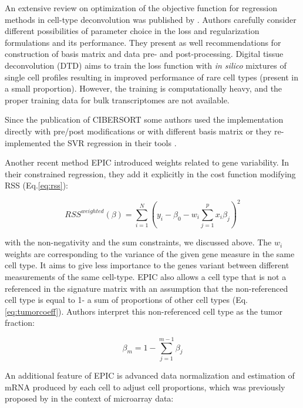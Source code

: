 \documentclass[12pt,]{book}
\theoremstyle{definition}
\theoremstyle{definition}
\theoremstyle{definition}
\theoremstyle{remark}
\begin{document}
An extensive review on optimization of the objective function for
regression methods in cell-type deconvolution was published by
\citet{Mohammadi2017}. Authors carefully consider different
possibilities of parameter choice in the loss and regularization
formulations and its performance. They present as well recommendations
for construction of basis matrix and data pre- and post-processing.
Digital tissue deconvolution (DTD) \citep{Gortler2018} aims to train the
loss function with \emph{in silico} mixtures of single cell profiles
resulting in improved performance of rare cell types (present in a small
proportion). However, the training is computationally heavy, and the
proper training data for bulk transcriptomes are not available.

Since the publication of CIBERSORT \citep{Newman2015} some authors
\citep{Chen2018, Schelker2017} used the \citet{Newman2015}
implementation directly with pre/post modifications or with different
basis matrix or they re-implemented the SVR regression in their tools
\citep{Chen2018}.

Another recent method EPIC \citep{Racle2017} introduced weights related
to gene variability. In their constrained regression, they add it
explicitly in the cost function modifying RSS (Eq.\eqref{eq:rss}):

\begin{equation}
RSS^{weighted} (\beta) = \sum_{i = 1}^{N}(y_i - \beta_0 - w_i \sum_{j=1}^p x_i\beta_j)^2  \label{eq:epic}
\end{equation}

with the non-negativity and the sum constraints, we discussed above. The
\(w_i\) weights are corresponding to the variance of the given gene
measure in the same cell type. It aims to give less importance to the
genes variant between different measurements of the same cell-type. EPIC
also allows a cell type that is not a referenced in the signature matrix
with an assumption that the non-referenced cell type is equal to 1- a
sum of proportions of other cell types (Eq.\eqref{eq:tumorcoeff}). Authors
interpret this non-referenced cell type as the tumor fraction:

\begin{equation}
\beta_m = 1 - \sum_{j=1}^{m-1}\beta_j \label{eq:tumorcoeff}
\end{equation}

An additional feature of EPIC is advanced data normalization and
estimation of mRNA produced by each cell to adjust cell proportions,
which was previously proposed by \citet{Liebner2014} in the context of
microarray data:
\end{document}
